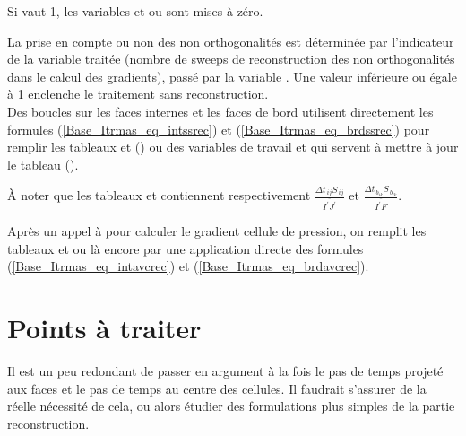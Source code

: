 Si  vaut 1, les variables  et  ou 
sont mises \`a z\'ero.

La prise en compte ou non des non orthogonalit\'es est d\'etermin\'ee par
l'indicateur  de la variable trait\'ee (nombre de sweeps de
reconstruction des non orthogonalit\'es dans le calcul des gradients), pass\'e
par la variable . Une valeur inf\'erieure ou \'egale \`a 1 enclenche
le traitement sans reconstruction.\\
Des boucles sur les faces internes et les faces de bord utilisent directement
les formules (\ref{Base_Itrmas_eq_intssrec}) et (\ref{Base_Itrmas_eq_brdssrec}) pour remplir les
tableaux  et  () ou des variables de
travail  et  qui servent \`a mettre \`a jour le tableau
 ().

\`A noter que les tableaux  et  contiennent respectivement
$\displaystyle\frac{\Delta t_{\,ij}S_{\,ij}}{\overline{I^\prime J^\prime}}$ et
$\displaystyle\frac{\Delta t_{\,b_{ik}}S_{\,b_{ik}}}{\overline{I^\prime F}}$.

Apr\`es un appel \`a  pour calculer le gradient cellule de
pression, on remplit les tableaux  et  ou 
l\`a encore par une application directe des formules (\ref{Base_Itrmas_eq_intavcrec}) et
(\ref{Base_Itrmas_eq_brdavcrec}).

\section{Points \`a traiter}
Il est un peu redondant de passer en argument \`a la fois le pas de temps
projet\'e aux faces et le pas de temps au centre des cellules. Il faudrait
s'assurer de la r\'eelle n\'ecessit\'e de cela, ou alors \'etudier des
formulations plus simples de la partie reconstruction.

